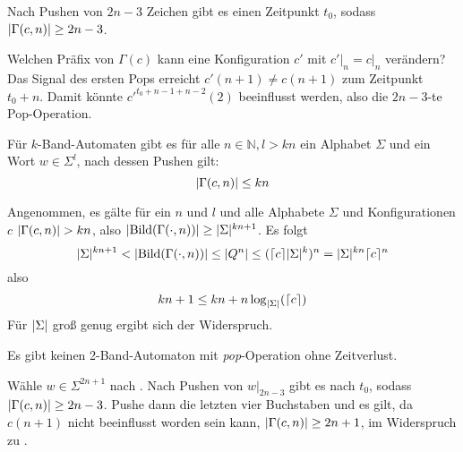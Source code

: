 \documentclass{article}
\DeclareMathOperator{\bild}{Bild}
\begin{document}
\begin{satz}
    \label{thm:locontent}
    Nach Pushen von $2n-3$ Zeichen gibt es einen Zeitpunkt $t_0$, sodass $\lvert\Gamma(c,n)\rvert \geq 2n-3$.
    \begin{beweis}
        Welchen Präfix von $\Gamma(c)$ kann eine Konfiguration $c'$ mit $c' \big|_n = c \big|_n$ verändern? Das Signal des ersten Pops erreicht $c'(n+1) \neq c(n+1)$ zum Zeitpunkt $t_0+n$. Damit könnte $c'^{t_0+n-1+n-2}(2)$ beeinflusst werden, also die $2n-3$-te Pop-Operation.
    \end{beweis}
\end{satz}

\begin{satz}
    \label{cor:spacesize}
    Für $k$-Band-Automaten gibt es für alle $n \in \mathbb{N}, l > kn$ ein Alphabet $\Sigma$ und ein Wort $w \in \Sigma^l$, nach dessen Pushen gilt:
    \[ \lvert\Gamma(c,n)\rvert \leq kn \]
    \begin{beweis}
        Angenommen, es gälte für ein $n$ und $l$ und alle Alphabete $\Sigma$ und Konfigurationen $c$ $\lvert\Gamma(c,n)\rvert > kn$, also $\abs{\bild(\Gamma(\cdot,n))} \geq \abs{\Sigma}^{kn+1}$.
        Es folgt
        \[ \abs\Sigma^{kn+1} < \abs{\bild(\Gamma(\cdot,n))} \leq \abs{Q^n} \leq (\ceil{c}\abs{\Sigma}^k)^n = \abs{\Sigma}^{kn} \ceil{c}^n \]
        also
        \[ kn + 1 \leq kn + n \log_{\lvert\Sigma\rvert}(\lceil c\rceil) \]
        Für $\lvert\Sigma\rvert$ groß genug ergibt sich der Widerspruch.
    \end{beweis}
\end{satz}

\begin{satz}
    Es gibt keinen 2-Band-Automaton mit \emph{pop}-Operation ohne Zeitverlust.
    \begin{beweis}
        Wähle $w \in \Sigma^{2n+1}$ nach . Nach Pushen von $w \big|_{2n-3}$ gibt es nach  $t_0$, sodass $\lvert\Gamma(c,n)\rvert \geq 2n-3$. Pushe dann die letzten vier Buchstaben und es gilt, da $c(n+1)$ nicht beeinflusst worden sein kann, $\lvert\Gamma(c,n)\rvert \geq 2n+1$, im Widerspruch zu .
    \end{beweis}
\end{satz}
\end{document}
